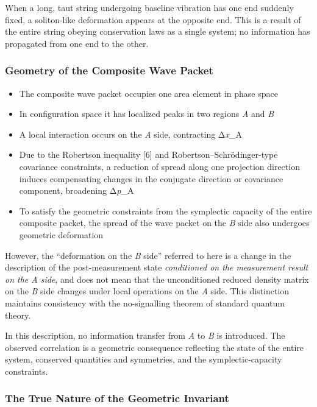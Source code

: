 \documentclass[
  11pt,
]{article}
\providecommand{\tightlist}{%
  \setlength{\itemsep}{0pt}\setlength{\parskip}{0pt}}
\begin{document}
When a long, taut string undergoing baseline vibration has one end
suddenly fixed, a soliton-like deformation appears at the opposite end.
This is a result of the entire string obeying conservation laws as a
single system; no information has propagated from one end to the other.

\subsubsection{Geometry of the Composite Wave
Packet}\label{geometry-of-the-composite-wave-packet}

\begin{itemize}
\tightlist
\item
  The composite wave packet occupies one area element in phase space
\item
  In configuration space it has localized peaks in two regions \emph{A}
  and \emph{B}
\item
  A local interaction occurs on the \emph{A} side, contracting
  Δ\emph{x}\_A
\item
  Due to the Robertson inequality {[}6{]} and
  Robertson--Schrödinger-type covariance constraints, a reduction of
  spread along one projection direction induces compensating changes in
  the conjugate direction or covariance component, broadening
  Δ\emph{p}\_A
\item
  To satisfy the geometric constraints from the symplectic capacity of
  the entire composite packet, the spread of the wave packet on the
  \emph{B} side also undergoes geometric deformation
\end{itemize}

However, the ``deformation on the \emph{B} side'' referred to here is a
change in the description of the post-measurement state
\emph{conditioned on the measurement result on the A side}, and does not
mean that the unconditioned reduced density matrix on the \emph{B} side
changes under local operations on the \emph{A} side. This distinction
maintains consistency with the no-signalling theorem of standard quantum
theory.

In this description, no information transfer from \emph{A} to \emph{B}
is introduced. The observed correlation is a geometric consequence
reflecting the state of the entire system, conserved quantities and
symmetries, and the symplectic-capacity constraints.

\subsubsection{The True Nature of the Geometric
Invariant}\label{the-true-nature-of-the-geometric-invariant}
\end{document}
